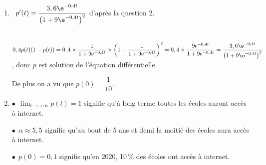 \begin{enumerate}
\item 




\starredbullet~$p'(t) = \dfrac{3,6\e^{-0,4t}}{\left(1 + 9\e^{-0,4t} \right)^2}$ d'après la question 2.

\starredbullet~$0,4p(t)(1 - p(t)) = 0,4 \times \dfrac{1}{1 + 9\text{e}^{-0,4t}} \times \left(1 - \dfrac{1}{1 + 9\text{e}^{-0,4t}} \right)^2 = 0,4\times \dfrac{9\text{e}^{-0,4t}}{1 + 9\text{e}^{-0,4t}} = \dfrac{3,6\e^{-0,4t}}{\left(1 + 9\e^{-0,4t} \right)^2}$, donc $p$ est solution de l'équation différentielle.

De plus on a vu que $p(0) = \dfrac{1}{10}$.
\item 








$\bullet~~$$\displaystyle\lim_{t \to + \infty} p(t) = 1$ signifie qu'à long terme toutes les écoles auront accès à internet.

$\bullet~~$$\alpha \approx 5,5$ signifie qu'au bout de 5 ans et demi la moitié des écoles aura accès à internet.

$\bullet~~$$p(0) = 0,1$ signifie qu'en 2020, 10\,\% des écoles ont accès à internet.
\end{enumerate}
